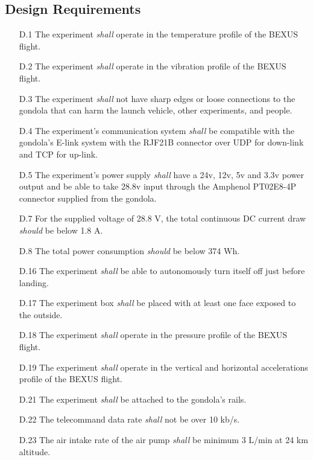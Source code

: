 \documentclass[a4paper,12pt,twoside]{article}
\begin{document}
\subsection{Design Requirements}

\begin{enumerate}
    \item[D.1] The experiment \textit{shall} operate in the temperature profile of the BEXUS flight\cite{BexusManual}.
    \item[D.2] The experiment \textit{shall} operate in the vibration profile of the BEXUS flight\cite{BexusManual}.
    \item[D.3] The experiment \textit{shall} not have sharp edges or loose connections to the gondola that can harm the launch vehicle, other experiments, and people.%
    \item[D.4] The experiment's communication system \textit{shall} be compatible with the gondola's E-link system with the RJF21B connector over UDP for down-link and TCP for up-link.
    \item[D.5] The experiment's power supply \textit{shall} have a 24v, 12v, 5v and 3.3v power output and be able to take 28.8v input through the Amphenol PT02E8-4P connector supplied from the gondola. 
    \item[D.7] For the supplied voltage of 28.8 V, the total continuous DC current draw \textit{should} be below 1.8 A.
    \item[D.8] The total power consumption \textit{should} be below 374 Wh.
    \item[D.16] The experiment \textit{shall} be able to autonomously turn itself off just before landing.
    \item[D.17] The experiment box \textit{shall} be placed with at least one face exposed to the outside.
    \item[D.18] The experiment \textit{shall} operate in the pressure profile of the BEXUS flight\cite{BexusManual}.
    \item[D.19] The experiment \textit{shall} operate in the vertical and horizontal accelerations profile of the BEXUS flight\cite{BexusManual}.
    \item[D.21] The experiment \textit{shall} be attached to the gondola's rails.
    \item[D.22] The telecommand data rate \textit{shall} not be over 10 kb/s.
    \item[D.23] The air intake rate of the air pump \textit{shall} be minimum 3 L/min at 24 km altitude.

\end{enumerate}
\end{document}
